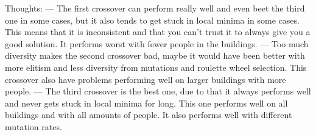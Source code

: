 Thoughts:
— The first crossover can perform really well and even beet the third one in some cases, but it also tends to get stuck in local minima in some cases. This means that it is inconsistent and that you can't trust it to always give you a good solution. It performs worst with fewer people in the buildings.
— Too much diversity makes the second crossover bad, maybe it would have been better with more elitism and less diversity from mutations and roulette wheel selection. This crossover also have problems performing well on larger buildings with more people.
— The third crossover is the best one, due to that it always performs well and never gets stuck in local minima for long. This one performs well on all buildings and with all amounts of people. It also performs well with different mutation rates.